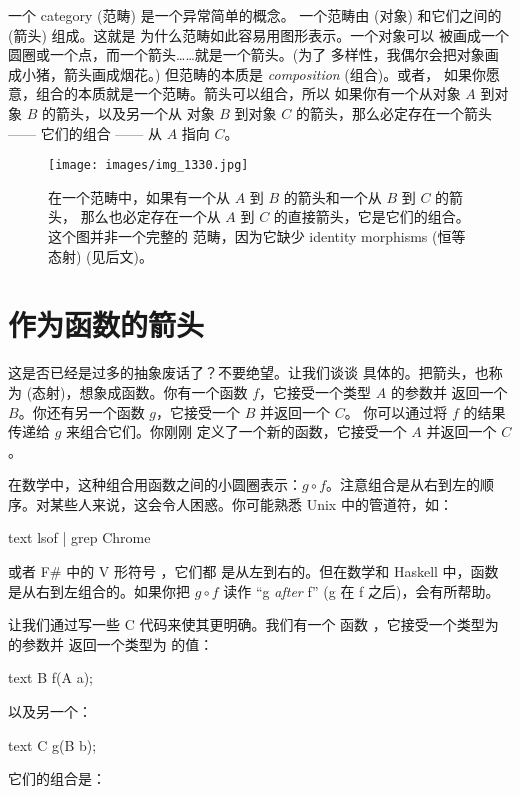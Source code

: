 
\lettrine[lhang=0.17]{一}{个} category (范畴) 是一个异常简单的概念。
一个范畴由  (对象) 和它们之间的  (箭头) 组成。这就是
为什么范畴如此容易用图形表示。一个对象可以
被画成一个圆圈或一个点，而一个箭头……就是一个箭头。(为了
多样性，我偶尔会把对象画成小猪，箭头画成烟花。) 但范畴的本质是 \emph{composition} (组合)。或者，
如果你愿意，组合的本质就是一个范畴。箭头可以组合，所以
如果你有一个从对象 $A$ 到对象 $B$ 的箭头，以及另一个从
对象 $B$ 到对象 $C$ 的箭头，那么必定存在一个箭头 —— 它们的组合
—— 从 $A$ 指向 $C$。

\begin{figure}
  \centering
  \texttt{[image: images/img\_1330.jpg]}
  \caption{在一个范畴中，如果有一个从 $A$ 到 $B$ 的箭头和一个从 $B$ 到 $C$ 的箭头，
    那么也必定存在一个从 $A$ 到 $C$ 的直接箭头，它是它们的组合。这个图并非一个完整的
    范畴，因为它缺少 identity morphisms (恒等态射) (见后文)。}
\end{figure}

\section{作为函数的箭头}

这是否已经是过多的抽象废话了？不要绝望。让我们谈谈
具体的。把箭头，也称为  (态射)，想象成函数。你有一个函数 $f$，它接受一个类型 $A$ 的参数并
返回一个 $B$。你还有另一个函数 $g$，它接受一个 $B$ 并返回一个 $C$。
你可以通过将 $f$ 的结果传递给 $g$ 来组合它们。你刚刚
定义了一个新的函数，它接受一个 $A$ 并返回一个 $C$。

在数学中，这种组合用函数之间的小圆圈表示：$g \circ f$。注意组合是从右到左的顺序。对某些人来说，这会令人困惑。你可能熟悉
Unix 中的管道符，如：

\begin{snip}{text}
lsof | grep Chrome
\end{snip}
或者 F\# 中的 V 形符号 \code{>>}，它们都
是从左到右的。但在数学和 Haskell 中，函数
是从右到左组合的。如果你把 $g \circ f$ 读作 “g \emph{after} f” (g 在 f 之后)，会有所帮助。

让我们通过写一些 C 代码来使其更明确。我们有一个
函数 ，它接受一个类型为  的参数并
返回一个类型为  的值：

\begin{snip}{text}
B f(A a);
\end{snip}
以及另一个：

\begin{snip}{text}
C g(B b);
\end{snip}
它们的组合是：

